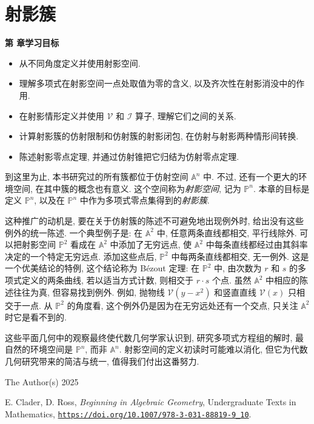 \chapter{射影簇}\label{chap:projective-varieties}

\noindent\textbf{第 \thechapter{} 章学习目标}
\begin{itemize}
  \item 从不同角度定义并使用射影空间.
  \item 理解多项式在射影空间一点处取值为零的含义, 以及齐次性在射影消没中的作用.
  \item 在射影情形定义并使用 $\mathcal{V}$ 和 $\mathcal{I}$ 算子, 理解它们之间的关系.
  \item 计算射影簇的仿射限制和仿射簇的射影闭包, 在仿射与射影两种情形间转换.
  \item 陈述射影零点定理, 并通过仿射锥把它归结为仿射零点定理.
\end{itemize}

到这里为止, 本书研究过的所有簇都位于仿射空间 $\mathbb{A}^{n}$ 中. 不过, 还有一个更大的环境空间, 在其中\textquotedbl{}簇\textquotedbl{}的概念也有意义. 这个空间称为\emph{射影空间}, 记为 $\mathbb{P}^{n}$. 本章的目标是定义 $\mathbb{P}^{n}$, 以及在 $\mathbb{P}^{n}$ 中作为多项式零点集得到的\emph{射影簇}.

这种推广的动机是, 要在关于仿射簇的陈述不可避免地出现例外时, 给出没有这些例外的统一陈述. 一个典型例子是: 在 $\mathbb{A}^{2}$ 中, 任意两条直线都相交, 平行线除外. 可以把射影空间 $\mathbb{P}^{2}$ 看成在 $\mathbb{A}^{2}$ 中添加了\textquotedbl{}无穷远点\textquotedbl{}, 使 $\mathbb{A}^{2}$ 中每条直线都经过由其斜率决定的一个特定无穷远点. 添加这些点后, $\mathbb{P}^{2}$ 中每两条直线都相交, 无一例外. 这是一个优美结论的特例, 这个结论称为 Bézout 定理: 在 $\mathbb{P}^{2}$ 中, 由次数为 $r$ 和 $s$ 的多项式定义的两条曲线, 若以适当方式计数, 则相交于 $r\cdot s$ 个点. 虽然 $\mathbb{A}^{2}$ 中相应的陈述往往为真, 但容易找到例外. 例如, 抛物线 $\mathcal{V}(y-x^{2})$ 和竖直直线 $\mathcal{V}(x)$ 只相交于一点. 从 $\mathbb{P}^{2}$ 的角度看, 这个例外仍是因为在\textquotedbl{}无穷远处\textquotedbl{}还有一个交点, 只关注 $\mathbb{A}^{2}$ 时它是看不到的.

这些平面几何中的观察最终使代数几何学家认识到, 研究多项式方程组的解时, 最自然的环境空间是 $\mathbb{P}^{n}$, 而非 $\mathbb{A}^{n}$. 射影空间的定义初读时可能难以消化, 但它为代数几何研究带来的简洁与统一, 值得我们付出这番努力.

\par\smallskip
{\footnotesize
\noindent\textcopyright{} The Author(s) 2025\par
\noindent E. Clader, D. Ross, \emph{Beginning in Algebraic Geometry}, Undergraduate Texts in Mathematics,
\href{https://doi.org/10.1007/978-3-031-88819-9_10}{\nolinkurl{https://doi.org/10.1007/978-3-031-88819-9_10}}.\par}
